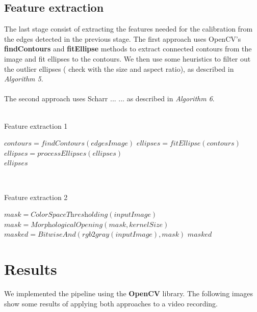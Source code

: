 \documentclass[journal]{IEEEtran}
\begin{document}
\subsection{Feature extraction}
The last stage consist of extracting the features needed for the calibration from the edges detected in the previous stage. The first approach uses OpenCV's \textbf{findContours} and \textbf{fitEllipse} methods to extract connected contours from the image and fit ellipses to the contours. We then use some heuristics to filter out the outlier ellipses ( check with the size and aspect ratio), as described in \textit{Algorithm 5}.
\\
\\
The second approach uses Scharr ... %
... as described in \textit{Algorithm 6}.
\\
\\
\begin{algorithm}
\caption{Feature extraction 1}
\begin{algorithmic}[1]
\State $contours = \textit{findContours}(edgesImage)$
\State $ellipses = \textit{fitEllipse}(contours)$
\State $ellipses = \textit{processEllipses}(ellipses)$\\
\Return $ellipses$
\end{algorithmic}
\end{algorithm}
\\
\begin{algorithm}
\caption{Feature extraction 2}
\begin{algorithmic}[1]
\State $mask   = \textit{ColorSpaceThresholding}(inputImage)$
\State $mask   = \textit{MorphologicalOpening}(mask, kernelSize)$
\State $masked = \textit{BitwiseAnd}( \textit{rgb2gray}( inputImage ), mask )$
\Return $masked$
\end{algorithmic}
\end{algorithm}

\section{Results}
We implemented the pipeline using the \textbf{OpenCV} library. The following images show some results of applying both approaches to a video recording.
\end{document}
